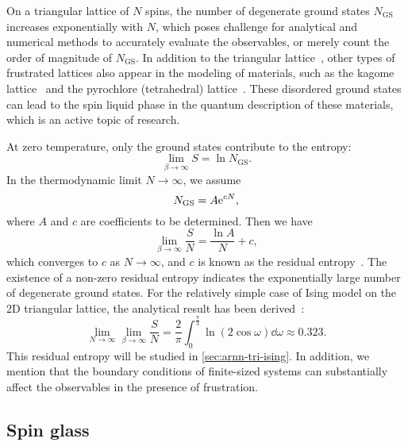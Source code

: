 On a triangular lattice of $N$ spins, the number of degenerate ground states $N_\text{GS}$ increases exponentially with $N$, which poses challenge for analytical and numerical methods to accurately evaluate the observables, or merely count the order of magnitude of $N_\text{GS}$. In addition to the triangular lattice~\cite{liu2020intrinsic}, other types of frustrated lattices also appear in the modeling of materials, such as the kagome lattice~\cite{wolf1988ising} and the pyrochlore (tetrahedral) lattice~\cite{siddharthan1999ising}. These disordered ground states can lead to the spin liquid phase in the quantum description of these materials, which is an active topic of research.

At zero temperature, only the ground states contribute to the entropy:
\begin{equation}
\lim_{\beta \to \infty} S = \ln N_\text{GS}.
\end{equation}
In the thermodynamic limit $N \to \infty$, we assume
\begin{equation}
N_\text{GS} = A \mathrm{e}^{c N},
\end{equation}
where $A$ and $c$ are coefficients to be determined. Then we have
\begin{equation}
\lim_{\beta \to \infty} \frac{S}{N} = \frac{\ln A}{N} + c,
\end{equation}
which converges to $c$ as $N \to \infty$, and $c$ is known as the residual entropy~\cite{wannier1950antiferromagnetism, mambrini1999residual, vanderstraeten2018residual}. The existence of a non-zero residual entropy indicates the exponentially large number of degenerate ground states. For the relatively simple case of Ising model on the 2D triangular lattice, the analytical result has been derived~\cite{wannier1950antiferromagnetism, wannier1973antiferromagnetism, houtappel1950order}:
\begin{equation}
\lim_{N \to \infty} \lim_{\beta \to \infty} \frac{S}{N} = \frac{2}{\pi} \int_0^{\frac{\pi}{3}} \ln(2 \cos \omega) \dd \omega \approx 0.323.
\end{equation}
This residual entropy will be studied in \cref{sec:arnn-tri-ising}. In addition, we mention that the boundary conditions of finite-sized systems can substantially affect the observables in the presence of frustration.

\subsection{Spin glass}
\label{sec:random-interactions}
\label{sec:ea}
\label{sec:sk}

